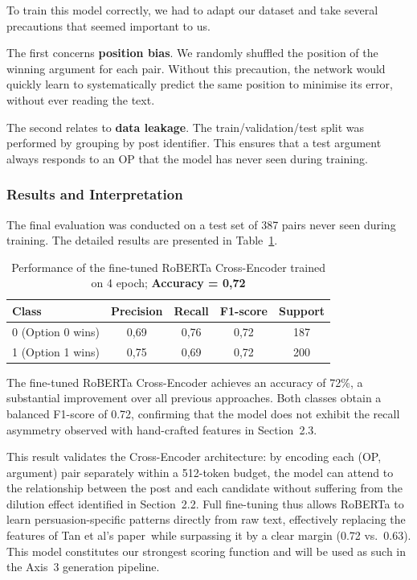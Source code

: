 \documentclass[11pt,a4paper]{article}
\begin{document}
To train this model correctly, we had to adapt our dataset and take several
precautions that seemed important to us.

The first concerns \textbf{position bias}. We randomly shuffled the position
of the winning argument for each pair. Without this precaution, the network
would quickly learn to systematically predict the same position to minimise
its error, without ever reading the text.

The second relates to \textbf{data leakage}. The train/validation/test split
was performed by grouping by post identifier. This ensures that a test argument
always responds to an OP that the model has never seen during training.


\subsubsection{Results and Interpretation}

The final evaluation was conducted on a test set of 387 pairs never seen
during training. The detailed results are presented in Table~\ref{tab:roberta_results}.

\begin{table}[h]
\centering
\begin{tabular}{lcccc}
\hline
\textbf{Class} & \textbf{Precision} & \textbf{Recall} & \textbf{F1-score} & \textbf{Support} \\
\hline
0 (Option 0 wins) & 0{,}69 & 0{,}76 & 0{,}72 & 187 \\
1 (Option 1 wins) & 0{,}75 & 0{,}69 & 0{,}72 & 200 \\
\hline
\end{tabular}
\caption{Performance of the fine-tuned RoBERTa Cross-Encoder trained on 4 epoch; \textbf{Accuracy = 0{,}72}}
\label{tab:roberta_results}
\end{table}

The fine-tuned RoBERTa Cross-Encoder achieves an accuracy of 72\%, a substantial improvement over all previous approaches. Both classes obtain a balanced F1-score of 0.72, confirming that the model does not exhibit the recall asymmetry observed with hand-crafted features in Section~2.3.

This result validates the Cross-Encoder architecture: by encoding each 
(OP, argument) pair separately within a 512-token budget, the model can 
attend to the relationship between the post and each candidate without 
suffering from the dilution effect identified in Section~2.2. Full 
fine-tuning thus allows RoBERTa to learn persuasion-specific patterns directly from raw text, effectively replacing the features 
 of Tan et al's paper\ while surpassing it by a clear margin 
(0.72 vs.\ 0.63). This model constitutes our strongest 
scoring function and will be used as such in the Axis~3 generation 
pipeline. 
\vspace{1cm}
\end{document}
